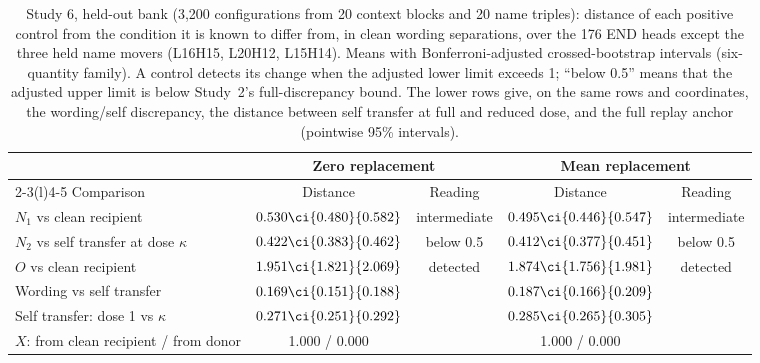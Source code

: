 \begin{table}[htbp]
\centering\small
\caption{Study 6, held-out bank (3,200 configurations from 20 context blocks and 20 name triples): distance of each positive control from the condition it is known to differ from, in clean wording separations, over the 176 END heads except the three held name movers (L16H15, L20H12, L15H14). Means with Bonferroni-adjusted crossed-bootstrap intervals (six-quantity family). A control detects its change when the adjusted lower limit exceeds 1; ``below 0.5'' means that the adjusted upper limit is below Study~2's full-discrepancy bound. The lower rows give, on the same rows and coordinates, the wording/self discrepancy, the distance between self transfer at full and reduced dose, and the full replay anchor (pointwise 95\% intervals).}
\label{tab:positive-control}
\footnotesize\setlength{\tabcolsep}{3pt}
\begin{tabular}{@{}lcccc@{}}
\toprule
 & \multicolumn{2}{c}{Zero replacement} & \multicolumn{2}{c}{Mean replacement} \\
\cmidrule(lr){2-3}\cmidrule(l){4-5}
Comparison & Distance & Reading & Distance & Reading \\
\midrule
$N_1$ vs clean recipient & $0.530\ci{0.480}{0.582}$ & intermediate & $0.495\ci{0.446}{0.547}$ & intermediate \\
$N_2$ vs self transfer at dose $\kappa$ & $0.422\ci{0.383}{0.462}$ & below 0.5 & $0.412\ci{0.377}{0.451}$ & below 0.5 \\
$O$ vs clean recipient & $1.951\ci{1.821}{2.069}$ & detected & $1.874\ci{1.756}{1.981}$ & detected \\
\addlinespace
Wording vs self transfer & $0.169\ci{0.151}{0.188}$ & & $0.187\ci{0.166}{0.209}$ & \\
Self transfer: dose 1 vs $\kappa$ & $0.271\ci{0.251}{0.292}$ & & $0.285\ci{0.265}{0.305}$ & \\
$X$: from clean recipient / from donor & 1.000 / 0.000 & & 1.000 / 0.000 & \\
\bottomrule
\end{tabular}
\end{table}
